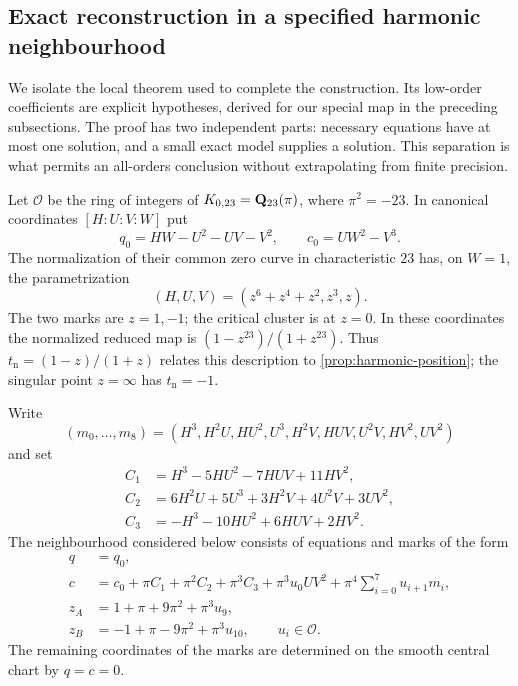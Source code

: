 \subsection{Exact reconstruction in a specified harmonic neighbourhood}
\label{sec:harmonic-reconstruction}

We isolate the local theorem used to complete the construction.
Its low-order coefficients are explicit hypotheses, derived for our
special map in the preceding subsections.  The proof has two independent
parts: necessary equations have at most one solution, and a small exact
model supplies a solution.  This separation is what permits an
all-orders conclusion without extrapolating from finite precision.

Let $\mathcal O$ be the ring of integers of
$K_{0,23}=\mathbf Q_{23}(\pi)$, where $\pi^2=-23$.
In canonical coordinates $[H:U:V:W]$ put
\[
 q_0=HW-U^2-UV-V^2,\qquad c_0=UW^2-V^3.
\]
The normalization of their common zero curve in characteristic $23$
has, on $W=1$, the parametrization
\[
 (H,U,V)=(z^6+z^4+z^2,z^3,z).
\]
The two marks are $z=1,-1$; the critical cluster is at $z=0$.
In these coordinates the normalized reduced map is
$(1-z^{23})/(1+z^{23})$.  Thus
$t_{\mathrm n}=(1-z)/(1+z)$ relates this description to
\cref{prop:harmonic-position}; the singular point $z=\infty$
has $t_{\mathrm n}=-1$.

Write
\[
 (m_0,\ldots,m_8)
 =(H^3,H^2U,HU^2,U^3,H^2V,HUV,U^2V,HV^2,UV^2)
\]
and set
\begin{align*}
 C_1&=H^3-5HU^2-7HUV+11HV^2,\\
 C_2&=6H^2U+5U^3+3H^2V+4U^2V+3UV^2,\\
 C_3&=-H^3-10HU^2+6HUV+2HV^2.
\end{align*}
The neighbourhood considered below consists of equations and marks
of the form
\begin{equation}\label{eq:harmonic-neighbourhood}
\begin{aligned}
 q&=q_0,\\
 c&=c_0+\pi C_1+\pi^2C_2+\pi^3C_3
       +\pi^3 u_0UV^2+\pi^4\sum_{i=0}^{7}u_{i+1}m_i,\\
 z_A&=1+\pi+9\pi^2+\pi^3u_9,\\
 z_B&=-1+\pi-9\pi^2+\pi^3u_{10},
 \qquad u_i\in\mathcal O.
\end{aligned}
\end{equation}
The remaining coordinates of the marks are determined on the smooth
central chart by $q=c=0$.

